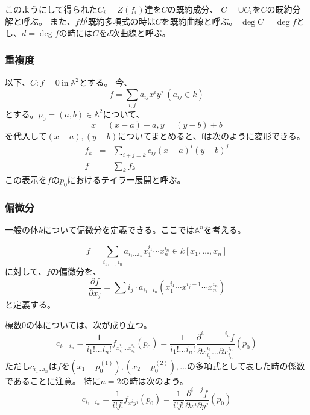 \documentclass[a4]{article}
\newcommand{\affine}[1]{\mathbb{#1}}
\begin{document}
        このようにして得られた$C_i=Z(f_i)$達を$C$の既約成分、
        $C=\cup {C_i}$を$C$の既約分解と呼ぶ。
        また、$f$が既約多項式の時は$C$を既約曲線と呼ぶ。
        $\deg C=\deg f$とし、$d=\deg f$の時には$C$を$d$次曲線と呼ぶ。

        \subsubsection{重複度}
        以下、$C:f=0 ~\mbox{in}~ \affine{A}^2$とする。
        今、
        \[ f=\sum_{i,j}{a_{ij} x^i y^j} ~ (a_{ij} \in k)\]
        とする。$p_0=(a,b) \in \affine{A}^2$について、
        \[ x=(x-a)+a, y=(y-b)+b\]
        を代入して$(x-a), (y-b)$についてまとめると、fは次のように変形できる。
        \begin{eqnarray*}
            f_k&=&\sum_{i+j=k}{c_{ij}(x-a)^i(y-b)^j} \\
            f&=&\sum_{k}{f_k}
        \end{eqnarray*}
        この表示を$f$の$p_0$におけるテイラー展開と呼ぶ。

            \subsubsection{偏微分}
            一般の体$k$について偏微分を定義できる。ここでは$\affine{A}^n$を考える。
            \begin{Def}[偏微分]
            \[ f=\sum_{i_1, \dots, i_n} {a_{ i_1 \dots i_n } x^{i_1}_1 \dotsm x^{i_n}_n} \in k[x_1, \dots, x_n]\]
            に対して、$f$の偏微分を、
            \[ \frac{\partial f}{\partial x_{j}}=\sum{i_j \cdot a_{ i_1 \dots i_n } (x^{i_1}_1 \dotsm x^{i_j-1} \dotsm x^{i_n}_n) } \]
            と定義する。
            \end{Def}

            標数0の体については、次が成り立つ。
            \[
                c_{i_1 \dots i_n}
                =\frac{1}{i_1! \dots i_n!} f_{x_{i_1}^{i_1} \dots x_{i_n}^{i_n}}(p_0)
                =\frac{1}{i_1! \dots i_n!} \frac{\partial^{i_1+\dots+i_n} f}{\partial x_{i_1}^{i_1} \dots \partial x_{i_n}^{i_n}}(p_0)
            \]
            ただし$c_{i_1 \dots i_n}$は$f$を$(x_1-p_0^{(1)}), (x_2-p_0^{(2)}), \dots$の多項式として表した時の係数であることに注意。
            特に$n=2$の時は次のよう。
            \[
                c_{i_1 \dots i_n}
                =\frac{1}{i! j!} f_{x^{i} y^j}(p_0)
                =\frac{1}{i! j!} \frac{\partial^{i+j} f}{\partial x^i \partial y^j}(p_0)
            \]
\end{document}
